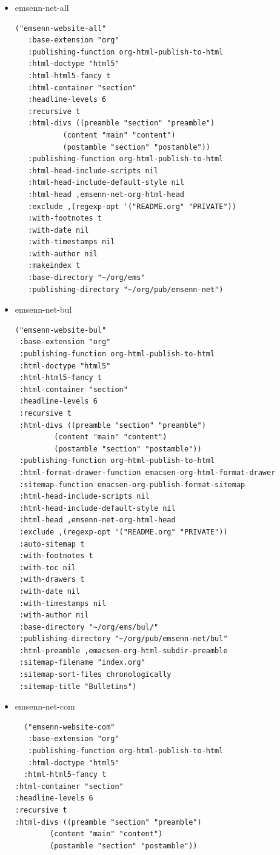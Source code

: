 \documentclass[11pt]{article}
\begin{document}
\begin{itemize}
\begin{itemize}
\begin{itemize}
\begin{itemize}
\begin{verbatim}
\end{verbatim}
\item emsenn-net-all
\label{sec:org0587d48}
\begin{verbatim}
("emsenn-website-all"
   :base-extension "org"
   :publishing-function org-html-publish-to-html
   :html-doctype "html5"
   :html-html5-fancy t
   :html-container "section"
   :headline-levels 6
   :recursive t
   :html-divs ((preamble "section" "preamble")
	       (content "main" "content")
	       (postamble "section" "postamble"))
   :publishing-function org-html-publish-to-html
   :html-head-include-scripts nil
   :html-head-include-default-style nil
   :html-head ,emsenn-net-org-html-head
   :exclude ,(regexp-opt '("README.org" "PRIVATE"))
   :with-footnotes t
   :with-date nil
   :with-timestamps nil
   :with-author nil
   :makeindex t
   :base-directory "~/org/ems"
   :publishing-directory "~/org/pub/emsenn-net")
\end{verbatim}
\item emsenn-net-bul
\label{sec:orgfc8ea74}
\begin{verbatim}
("emsenn-website-bul"
 :base-extension "org"
 :publishing-function org-html-publish-to-html
 :html-doctype "html5"
 :html-html5-fancy t
 :html-container "section"
 :headline-levels 6
 :recursive t
 :html-divs ((preamble "section" "preamble")
	     (content "main" "content")
	     (postamble "section" "postamble"))
 :publishing-function org-html-publish-to-html
 :html-format-drawer-function emacsen-org-html-format-drawer
 :sitemap-function emacsen-org-publish-format-sitemap
 :html-head-include-scripts nil
 :html-head-include-default-style nil
 :html-head ,emsenn-net-org-html-head
 :exclude ,(regexp-opt '("README.org" "PRIVATE"))
 :auto-sitemap t
 :with-footnotes t
 :with-toc nil
 :with-drawers t
 :with-date nil
 :with-timestamps nil
 :with-author nil
 :base-directory "~/org/ems/bul/"
 :publishing-directory "~/org/pub/emsenn-net/bul"
 :html-preamble ,emacsen-org-html-subdir-preamble
 :sitemap-filename "index.org"
 :sitemap-sort-files chronologically
 :sitemap-title "Bulletins")
\end{verbatim}
\item emsenn-net-com
\label{sec:org14a38a4}
\begin{verbatim}
  ("emsenn-website-com"
   :base-extension "org"
   :publishing-function org-html-publish-to-html
   :html-doctype "html5"
  :html-html5-fancy t
:html-container "section"
:headline-levels 6
:recursive t
:html-divs ((preamble "section" "preamble")
	    (content "main" "content")
	    (postamble "section" "postamble"))

\end{verbatim}
\end{itemize}
\end{itemize}
\end{itemize}
\end{itemize}
\end{document}
